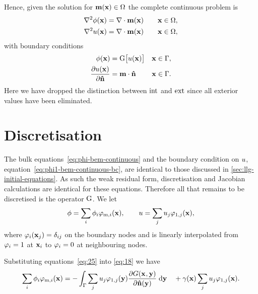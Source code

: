 Hence, given the solution for $\mathbf{m}(\mathbf{x}) \in \Omega$ the complete continuous problem is
 \begin{subequations}
   \label{eq:phi-bem-continuous}
   \begin{align}
     \label{eq:phim-bem-continuous}
     \nabla^2 \phi(\mathbf{x}) &= \nabla \cdot \mathbf{m}(\mathbf{x}) \quad & \mathbf{x} \in \Omega, \\
     \label{eq:phi1-bem-continuous}
     \nabla^2 u(\mathbf{x}) &= \nabla \cdot \mathbf{m}(\mathbf{x})    & \mathbf{x} \in \Omega,
   \end{align}
 \end{subequations}
with boundary conditions
 \begin{subequations}
   \label{eq:phi-bem-continuous-bc}
   \begin{align}
     \label{eq:phim-bem-continuous-bc}
     \phi(\mathbf{x}) &= {\mathbf{\mathrm{G}}} \big[ u(\mathbf{x}) \big]      & \mathbf{x} \in {\Gamma}, \\
     \label{eq:phi1-bem-continuous-bc}
       \frac{\partial u(\mathbf{x})}{\partial \mathbf{\hat{n}}} &= \mathbf{m} \cdot \mathbf{\hat{n}}  & \mathbf{x} \in {\Gamma}.
   \end{align}
 \end{subequations}
Here we have dropped the distinction between $\text{int}$ and $\text{ext}$ since all exterior values have been eliminated.


\section{Discretisation}
\label{sec:discretisation}

The bulk equations~\eqref{eq:phi-bem-continuous} and the boundary condition on $u$, equation~\eqref{eq:phi1-bem-continuous-bc}, are identical to those discussed in \autoref{sec:llg-initial-equations}.
As such the weak residual form, discretisation and Jacobian calculations are identical for these equations.
Therefore all that remains to be discretised is the operator ${\mathbf{\mathrm{G}}}$.
We let
\begin{equation}
  \phi = \sum_{i} \phi_{{i}} \varphi_{\text{m},{i}}(\mathbf{x}),
  \qquad
  u = \sum_{j} u_{{j}} \varphi_{1,{j}}(\mathbf{x}),
  \label{eq:25}
\end{equation}
where $\varphi_{i}(\mathbf{x}_{j}) = \delta_{{i} {j}}$ on the boundary nodes and is linearly interpolated from $\varphi_{i} = 1$ at $\mathbf{x}_{i}$ to $\varphi_{i} = 0$ at neighbouring nodes.

Substituting equations~\eqref{eq:25} into \eqref{eq:18} we have
\begin{equation*}
  \sum_{i} \phi_{{i}} \varphi_{\text{m},{i}}(\mathbf{x}) =
  - \int_{{\Gamma}} \sum_{j} u_{{j}} \varphi_{1,{j}}(\mathbf{y})
  \frac{\partial G(\mathbf{x}_{},\mathbf{y})}{\partial \mathbf{\hat{n}}(\mathbf{y})} {\; \text{d}} \mathbf{y}
  \quad + \gamma(\mathbf{x}) \sum_{j} u_{{j}} \varphi_{1,{j}}(\mathbf{x}).
\end{equation*}

